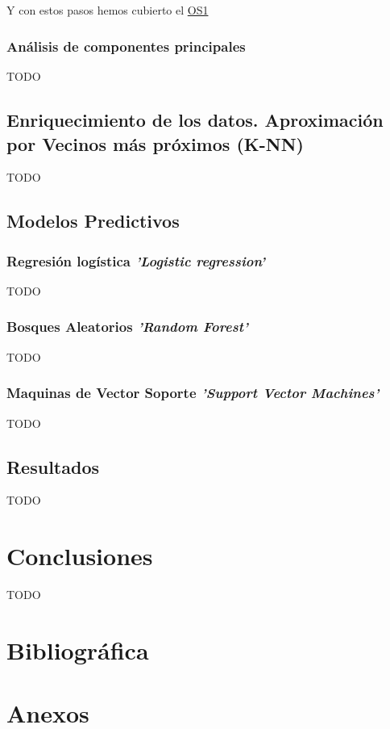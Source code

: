 \documentclass[10pt,a4paper,oneside]{book}
\begin{document}
\paragraph{}
Y con estos pasos hemos cubierto el \hyperref[os:OS1]{OS1}

\newpage
\subsection{Análisis de componentes principales}
TODO

\newpage
\section{Enriquecimiento de los datos. Aproximación por Vecinos más próximos (K-NN)}
TODO

\newpage
\section{Modelos Predictivos}

\subsection{Regresión logística \textit{'Logistic regression'}}
TODO

\subsection{Bosques Aleatorios \textit{'Random Forest'}}
TODO

\subsection{Maquinas de Vector Soporte \textit{'Support Vector Machines'}}
TODO

\newpage
\section{Resultados}
TODO

\newpage
\chapter{Conclusiones}
TODO

\chapter{Bibliográfica}

\cleardoublepage
{}
{}
\listoffigures

\chapter{Anexos}
\end{document}
